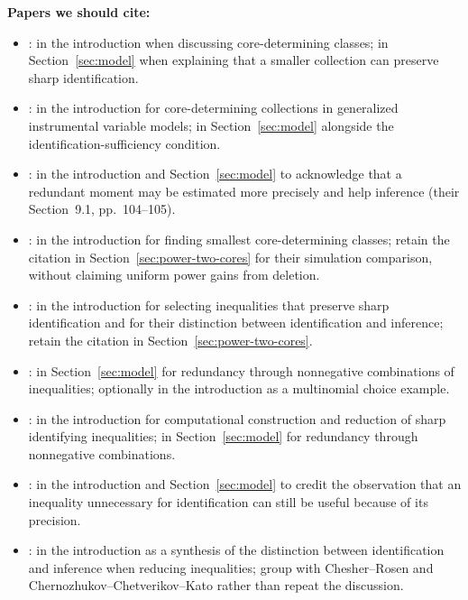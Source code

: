\documentclass[11pt]{article}
\numberwithin{equation}{section}
\theoremstyle{definition}
\begin{document}
{
\noindent\textbf{Papers we should cite:}
\begin{itemize}

\item \citet{galichon/henry:11}: in the introduction when discussing
core-determining classes; in Section~\ref{sec:model} when explaining
that a smaller collection can preserve sharp identification.

\item \citet{chesher/rosen:17}: in the introduction for core-determining
collections in generalized instrumental variable models; in
Section~\ref{sec:model} alongside the identification-sufficiency condition.

\item \citet{chesher/rosen:20}: in the introduction and
Section~\ref{sec:model} to acknowledge that a redundant moment may
be estimated more precisely and help inference
(their Section~9.1, pp.~104--105).

\item \citet{luo/wang:18}: in the introduction for finding smallest
core-determining classes; retain the citation in
Section~\ref{sec:power-two-cores} for their simulation comparison,
without claiming uniform power gains from deletion.

\item \citet*{luo/ponomarev/wang:26}: in the introduction for selecting
inequalities that preserve sharp identification and for their
distinction between identification and inference; retain the citation
in Section~\ref{sec:power-two-cores}.

\item \citet{pakes/porter:24}: {in Section~\ref{sec:model}
for redundancy through nonnegative combinations of inequalities;
optionally in the introduction as a multinomial choice example.}

\item \citet{mbakop:23}: in the introduction for computational
construction and reduction of sharp identifying inequalities; in
Section~\ref{sec:model} for redundancy through nonnegative combinations.

\item \citet*{chernozhukov/chet/kato:19}: in the introduction and
Section~\ref{sec:model} to credit the observation that an inequality
unnecessary for identification can still be useful because of its
precision.

\item \citet{molinari:20}: in the introduction as a synthesis of the
distinction between identification and inference when reducing
inequalities; group with Chesher--Rosen and
Chernozhukov--Chetverikov--Kato rather than repeat the discussion.


\end{itemize}}
\end{document}
